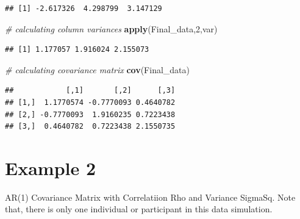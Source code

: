 \documentclass[]{book}
\newenvironment{Shaded}{\begin{snugshade}}{\end{snugshade}}
\newcommand{\CommentTok}[1]{\textcolor[rgb]{0.56,0.35,0.01}{\textit{#1}}}
\newcommand{\DecValTok}[1]{\textcolor[rgb]{0.00,0.00,0.81}{#1}}
\newcommand{\KeywordTok}[1]{\textcolor[rgb]{0.13,0.29,0.53}{\textbf{#1}}}
\newcommand{\NormalTok}[1]{#1}
\begin{document}
\begin{verbatim}
## [1] -2.617326  4.298799  3.147129
\end{verbatim}

\begin{Shaded}
\begin{Highlighting}[]
\CommentTok{# calculating column variances}
\KeywordTok{apply}\NormalTok{(Final_data,}\DecValTok{2}\NormalTok{,var)}
\end{Highlighting}
\end{Shaded}

\begin{verbatim}
## [1] 1.177057 1.916024 2.155073
\end{verbatim}

\begin{Shaded}
\begin{Highlighting}[]
\CommentTok{# calculating covariance matrix}
\KeywordTok{cov}\NormalTok{(Final_data)}
\end{Highlighting}
\end{Shaded}

\begin{verbatim}
##            [,1]       [,2]      [,3]
## [1,]  1.1770574 -0.7770093 0.4640782
## [2,] -0.7770093  1.9160235 0.7223438
## [3,]  0.4640782  0.7223438 2.1550735
\end{verbatim}

\hypertarget{example-2}{%
\section{Example 2}\label{example-2}}

AR(1) Covariance Matrix with Correlatiion Rho and Variance SigmaSq. Note that, there is only one individual or participant in this data simulation.
\end{document}
